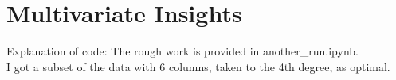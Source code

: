 \section{Multivariate Insights}
Explanation of code:
The rough work is provided in another\_run.ipynb.\\

I got a subset of the data with 6 columns, taken to the 4th degree, as optimal.